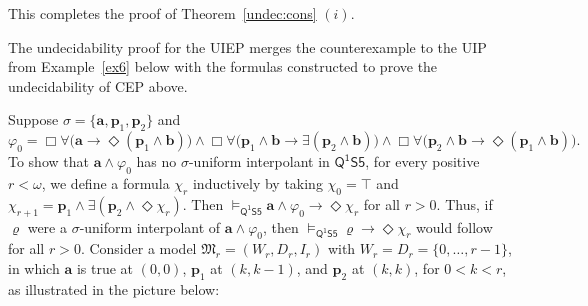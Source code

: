\documentclass{lmcs} %
\theoremstyle{plain}\newtheorem{satz}[thm]{Satz} %
\newcommand{\FOMS}{\ensuremath{\mathsf{Q^1S5}}}
\newcommand{\fform}[1]{\boldsymbol{#1}}
\newcommand{\pvar}{\fform{p}}
\newcommand{\avar}{\fform{a}}
\newcommand{\bvar}{\fform{b}}
\newcommand{\Bv}{\forall}
\newcommand{\Bh}{\Box}
\newcommand{\Dv}{\exists}
\newcommand{\Dh}{\Diamond}
\begin{document}
This completes the proof of Theorem~\ref{undec:cons} $(i)$.

The undecidability proof for the UIEP merges the counterexample to the UIP from Example~\ref{ex6} below with the formulas constructed to prove the undecidability of CEP above. 

\begin{exa}\label{ex6}
Suppose $\sigma=\{\avar,\pvar_{1},\pvar_{2}\}$ and 
%
$$
\varphi_{0} = \Bh\Bv \bigl(\avar \rightarrow \Dh (\pvar_{1} \wedge \bvar)\bigr) \land 
		\Bh\Bv \bigl(\pvar_{1} \wedge \bvar \rightarrow \Dv(\pvar_{2} \wedge \bvar)\bigr) \land{} 
\Bh\Bv \bigl(\pvar_{2} \wedge \bvar \rightarrow \Dh(\pvar_1 \wedge \bvar)\bigr).
$$
To show that $\avar \wedge \varphi_{0}$ has no $\sigma$-uniform interpolant in $\FOMS$, for every positive $r < \omega$, we define a formula $\chi_{r}$ inductively by taking $\chi_{0}= \top$ and $\chi_{r+1}= \pvar_{1} \wedge \exists (\pvar_{2} \wedge \Diamond \chi_{r})$. Then $\models_\FOMS\avar \land\varphi_0 \to \Diamond \chi_r$ for all $r>0$. Thus, if $\varrho$ were a $\sigma$-uniform interpolant of $\avar\land\varphi_0$, then
	$\models_\FOMS\varrho\to\Diamond\chi_r$ would follow for all $r>0$. Consider a model $\mathfrak{M}_{r}=(W_{r}, D_{r}, I_{r})$ with $W_{r}=D_{r}=\{0,\dots,r-1\}$, in which $\avar$ is true at $(0,0)$, $\pvar_1$ at $(k,k-1)$, and $\pvar_2$ at $(k,k)$, for $0<k<r$, as illustrated in the picture below: \\
%

\end{exa}
\end{document}
